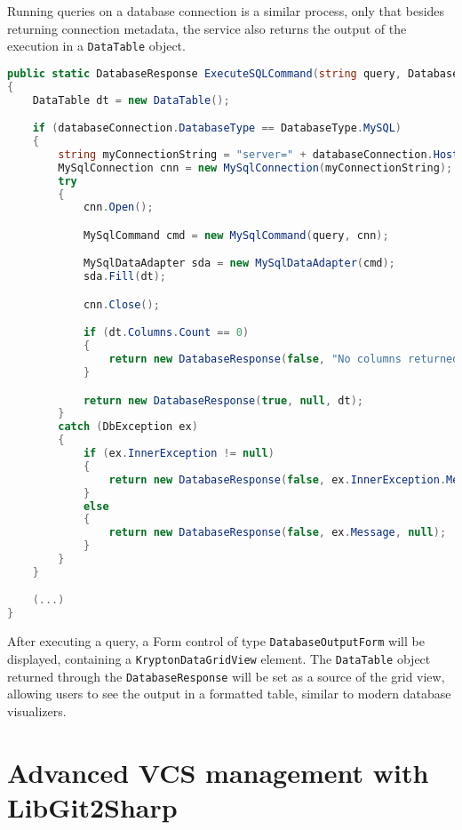 Running queries on a database connection is a similar process, only that besides returning connection metadata, the service also returns the output of the execution in a \texttt{DataTable} object.

\begin{lstlisting}[language=csharp, caption={The ExecuteSQLCommand() that sends a query to a database server}]
public static DatabaseResponse ExecuteSQLCommand(string query, DatabaseConnection databaseConnection)
{
    DataTable dt = new DataTable();

    if (databaseConnection.DatabaseType == DatabaseType.MySQL)
    {
        string myConnectionString = "server=" + databaseConnection.Hostname + ";port=" + databaseConnection.Port + ";database=" + databaseConnection.DatabaseName + ";uid=" + databaseConnection.Username + ";pwd=" + databaseConnection.Password + ";";
        MySqlConnection cnn = new MySqlConnection(myConnectionString);
        try
        {
            cnn.Open();

            MySqlCommand cmd = new MySqlCommand(query, cnn);

            MySqlDataAdapter sda = new MySqlDataAdapter(cmd);
            sda.Fill(dt);

            cnn.Close();

            if (dt.Columns.Count == 0)
            {
                return new DatabaseResponse(false, "No columns returned.", null);
            }

            return new DatabaseResponse(true, null, dt);
        }
        catch (DbException ex)
        {
            if (ex.InnerException != null)
            {
                return new DatabaseResponse(false, ex.InnerException.Message, null);
            }
            else
            {
                return new DatabaseResponse(false, ex.Message, null);
            }
        }
    }

    (...)
}
\end{lstlisting}

After executing a query, a Form control of type \texttt{DatabaseOutputForm} will be displayed, containing a \texttt{KryptonDataGridView} element. The \texttt{DataTable} object returned through the \texttt{DatabaseResponse} will be set as a source of the grid view, allowing users to see the output in a formatted table, similar to modern database visualizers.

\section{Advanced VCS management with LibGit2Sharp}


